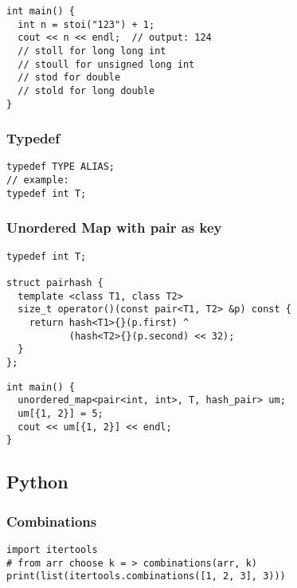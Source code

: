 \documentclass[twoside]{article}
\begin{document}
\begin{multicols*}{2}
\begin{verbatim}
int main() {
  int n = stoi("123") + 1;
  cout << n << endl;  // output: 124
  // stoll for long long int
  // stoull for unsigned long int
  // stod for double
  // stold for long double
}
\end{verbatim}

\subsubsectionfont{\large\bfseries\sffamily\underline}
\subsubsection*{Typedef}
\begin{verbatim}
typedef TYPE ALIAS;
// example:
typedef int T;
\end{verbatim}

\subsubsectionfont{\large\bfseries\sffamily\underline}
\subsubsection*{Unordered Map with pair as key}
\begin{verbatim}
typedef int T;

struct pairhash {
  template <class T1, class T2>
  size_t operator()(const pair<T1, T2> &p) const {
    return hash<T1>{}(p.first) ^
           (hash<T2>{}(p.second) << 32);
  }
};
\end{verbatim}
\vspace{-12pt}
\begin{verbatim}
int main() {
  unordered_map<pair<int, int>, T, hash_pair> um;
  um[{1, 2}] = 5;
  cout << um[{1, 2}] << endl;
}
\end{verbatim}

\subsectionfont{\bfseries\sffamily\centering\LARGE}
\vspace{0em}
\subsection*{Python}
\vspace{2em}
\subsubsectionfont{\large\bfseries\sffamily\underline}
\subsubsection*{Combinations}
\begin{verbatim}
import itertools
# from arr choose k = > combinations(arr, k)
print(list(itertools.combinations([1, 2, 3], 3)))
\end{verbatim}


\end{multicols*}
\end{document}
